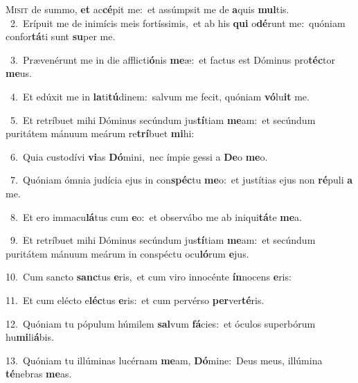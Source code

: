 \lettrine{\initial\textcolor{\initialcolor}{M}}{isit} de summo, \textbf{et} ac\-\textbf{cé}\-pit me:~\star et assúmpsit me de \textbf{a}\-quis \textbf{mul}\-tis.\\
{\numbfont\textcolor{\numbcolor}{~2.}}~Erípuit me de inimícis meis fortíssimis,~\dagger et ab his \textbf{qui} o\-\textbf{dé}\-runt me:~\star quóniam confor\-\textbf{tá}\-ti sunt \textbf{su}\-per me.\par
{\numbfont\textcolor{\numbcolor}{~3.}}~Prævenérunt me in die afflicti\-\textbf{ó}\-nis \textbf{me}\-æ:~\star et factus est Dóminus pro\-\textbf{téc}\-tor \textbf{me}\-us.\par
{\numbfont\textcolor{\numbcolor}{~4.}}~Et edúxit me in \textbf{la}\-ti\-\textbf{tú}\-dinem:~\star salvum me fecit, quóniam \textbf{vó}\-lu\textbf{it} me.\par
{\numbfont\textcolor{\numbcolor}{~5.}}~Et retríbuet mihi Dóminus secúndum jus\-\textbf{tí}\-tiam \textbf{me}\-am:~\star et secúndum puritátem mánuum meárum re\-\textbf{trí}\-buet \textbf{mi}\-hi:\par
{\numbfont\textcolor{\numbcolor}{~6.}}~Quia custodívi \textbf{vi}\-as \textbf{Dó}\-mini,~\star nec ímpie gessi a \textbf{De}\-o \textbf{me}\-o.\par
{\numbfont\textcolor{\numbcolor}{~7.}}~Quóniam ómnia judícia ejus in con\-\textbf{spéc}\-tu \textbf{me}\-o:~\star et justítias ejus non \textbf{ré}\-puli \textbf{a} me.\par
{\numbfont\textcolor{\numbcolor}{~8.}}~Et ero immacu\-\textbf{lá}\-tus cum \textbf{e}\-o:~\star et observábo me ab iniqui\-\textbf{tá}\-te \textbf{me}\-a.\par
{\numbfont\textcolor{\numbcolor}{~9.}}~Et retríbuet mihi Dóminus secúndum jus\-\textbf{tí}\-tiam \textbf{me}\-am:~\star et secúndum puritátem mánuum meárum in conspéctu ocu\-\textbf{ló}\-rum \textbf{e}\-jus.\par
{\numbfont\textcolor{\numbcolor}{10.}}~Cum sancto \textbf{sanc}\-tus \textbf{e}\-ris,~\star et cum viro innocénte \textbf{ín}\-nocens \textbf{e}\-ris:\par
{\numbfont\textcolor{\numbcolor}{11.}}~Et cum elécto e\-\textbf{léc}\-tus \textbf{e}\-ris:~\star et cum pervérso \textbf{per}\-ver\-\textbf{té}\-ris.\par
{\numbfont\textcolor{\numbcolor}{12.}}~Quóniam tu pópulum húmilem \textbf{sal}\-vum \textbf{fá}\-cies:~\star et óculos superbórum hu\-\textbf{mi}\-li\-\textbf{á}\-bis.\par
{\numbfont\textcolor{\numbcolor}{13.}}~Quóniam tu illúminas lucérnam \textbf{me}\-am, \textbf{Dó}\-mine:~\star Deus meus, illúmina \textbf{té}\-nebras \textbf{me}\-as.\par
